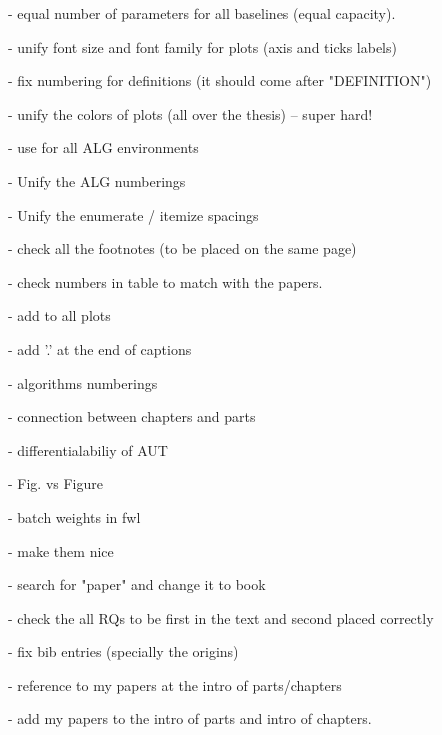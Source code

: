  - equal number of parameters for all baselines (equal capacity).

 - unify font size and font family for plots (axis and ticks labels)
 
 - fix numbering for definitions (it should come after "DEFINITION")
 
 - unify the colors of plots (all over the thesis) -- super hard!
 
 - use \small for all ALG environments
 
 - Unify the ALG numberings
 
 - Unify the enumerate / itemize spacings
 
 - check all the footnotes (to be placed on the same page)
 
 - check numbers in table to match with the papers.
 
 - add \selectfont to all plots
 
 - add '.' at the end of captions
 
 - algorithms numberings
 
 - connection between chapters and parts
 
 - differentialabiliy of AUT
 
 - Fig. vs Figure
 
 - batch weights in fwl
 
 - \url{} make them nice
 
 - search for "paper" and change it to book
 
 - check the all RQs to be first in the text and second placed correctly
 
 - fix bib entries (specially the origins)
 
 - reference to my papers at the intro of parts/chapters
 
 - add my papers to the intro of parts and intro of chapters.
 
